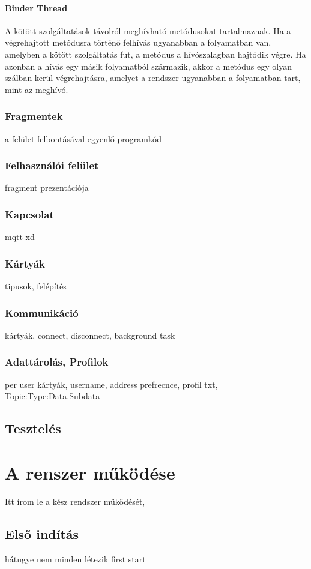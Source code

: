 \documentclass[
]{thesis-ekf}
\theoremstyle{definition}
\theoremstyle{remark}
\begin{document}
\subsubsection{Binder Thread}
A kötött szolgáltatások távolról meghívható metódusokat tartalmaznak. Ha a végrehajtott metódusra történő felhívás ugyanabban a folyamatban van, amelyben a kötött szolgáltatás fut, a metódus a hívószalagban hajtódik végre. Ha azonban a hívás egy másik folyamatból származik, akkor a metódus egy olyan szálban kerül végrehajtásra, amelyet a rendszer ugyanabban a folyamatban tart, mint az meghívó.



\subsection{Fragmentek}
a felület felbontásával egyenlő programkód
\subsection{Felhasználói felület}
fragment prezentációja
\subsection{Kapcsolat}
mqtt xd
\subsection{Kártyák}
tipusok, felépítés
\subsection{Kommunikáció}
kártyák, connect, disconnect, background task
\subsection{Adattárolás, Profilok}
per user kártyák, username, address prefrecnce, profil txt, Topic:Type:Data.Subdata

\section{Tesztelés}



\chapter{A renszer működése}
Itt írom le a kész rendszer működését, 
\section{Első indítás}
hátugye nem minden létezik first start
\end{document}
